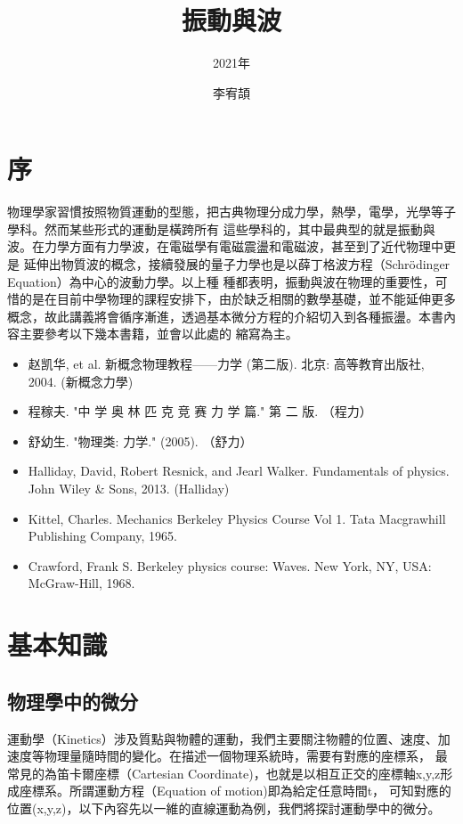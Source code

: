\documentclass[cn,10pt,math=newtx,chinesefont=founder]{elegantbook}
\title{振動與波}
\subtitle{2021年}
\author{李宥頡}
\institute{National Taiwan University}
\begin{document}
\maketitle
\frontmatter

\chapter*{序}
物理學家習慣按照物質運動的型態，把古典物理分成力學，熱學，電學，光學等子學科。然而某些形式的運動是橫跨所有
這些學科的，其中最典型的就是振動與波。在力學方面有力學波，在電磁學有電磁震盪和電磁波，甚至到了近代物理中更是
延伸出物質波的概念，接續發展的量子力學也是以薛丁格波方程（Schrödinger Equation）為中心的波動力學。以上種
種都表明，振動與波在物理的重要性，可惜的是在目前中學物理的課程安排下，由於缺乏相關的數學基礎，並不能延伸更多
概念，故此講義將會循序漸進，透過基本微分方程的介紹切入到各種振盪。本書內容主要參考以下幾本書籍，並會以此處的
縮寫為主。
\begin{itemize}
    \item 赵凯华, et al. 新概念物理教程——力学 (第二版). 北京: 高等教育出版社, 2004. (新概念力學)
    \item 程稼夫. "中 学 奥 林 匹 克 竞 赛 力 学 篇." 第 二 版. （程力）
    \item 舒幼生. "物理类: 力学." (2005). （舒力）
    \item Halliday, David, Robert Resnick, and Jearl Walker. Fundamentals of physics. John Wiley \& Sons, 2013. (Halliday)
    \item Kittel, Charles. Mechanics Berkeley Physics Course Vol 1. Tata Macgrawhill Publishing Company, 1965.
    \item Crawford, Frank S. Berkeley physics course: Waves. New York, NY, USA: McGraw-Hill, 1968.
\end{itemize}
\tableofcontents

\mainmatter

\chapter{基本知識}
\section{物理學中的微分}
運動學（Kinetics）涉及質點與物體的運動，我們主要關注物體的位置、速度、加速度等物理量隨時間的變化。在描述一個物理系統時，需要有對應的座標系，
最常見的為笛卡爾座標（Cartesian Coordinate)，也就是以相互正交的座標軸x,y,z形成座標系。所謂運動方程（Equation of motion)即為給定任意時間t，
可知對應的位置(x,y,z)，以下內容先以一維的直線運動為例，我們將探討運動學中的微分。
\end{document}
